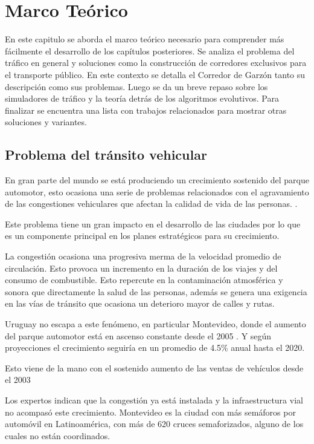 \chapter{Marco Teórico}

 En este capitulo se aborda el marco teórico necesario para comprender más fácilmente el desarrollo de los capítulos posteriores. Se analiza el problema del tráfico en general y soluciones como la construcción de corredores exclusivos para el transporte público. En este contexto se detalla el Corredor de Garzón tanto su descripción como sus problemas. Luego se da un breve repaso sobre los simuladores de tráfico y la teoría detrás de los algoritmos evolutivos. Para finalizar se encuentra una lista con trabajos relacionados para mostrar otras soluciones y variantes.

\section{Problema del tránsito vehicular}

En gran parte del mundo se está produciendo un crecimiento sostenido del parque automotor, esto ocasiona una serie de problemas relacionados con el agravamiento de las congestiones vehiculares que afectan la calidad de vida de las personas.  \citep{Cepal2003}.

Este problema tiene un gran impacto en el desarrollo de las ciudades por lo que es un componente principal en los planes estratégicos para su crecimiento.

La congestión ocasiona una progresiva merma de la velocidad promedio de circulación. Esto provoca un incremento en la duración de los viajes y del consumo de combustible. Esto repercute en la contaminación atmosférica y sonora que directamente la salud de las personas, además se genera una exigencia en las vías de tránsito que ocasiona un deterioro mayor de calles y rutas.

Uruguay no escapa a este fenómeno, en particular Montevideo, donde el aumento del parque automotor está en ascenso constante desde el 2005 \citep{INE2014}.
Y según proyecciones el crecimiento seguiría en un promedio de 4.5\% anual hasta el 2020. \citep{BBVA2013}

Esto viene de la mano con el sostenido aumento de las ventas de vehículos  desde el 2003 \citep{Autoanuario2014}

Los expertos indican que la congestión ya está instalada y la infraestructura vial no acompasó este crecimiento. Montevideo es la ciudad con más semáforos por automóvil en Latinoamérica, con más de 620 cruces semaforizados, alguno de los cuales no están coordinados.\citep{Subrayado2013}

